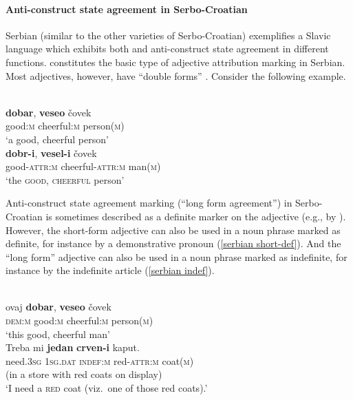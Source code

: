 \paragraph*{Anti\hyp{}construct state agreement in Serbo-Croatian}
\label{serbian synchr}
Serbian (similar to the other varieties of Serbo-Croatian) exemplifies a Slavic language which exhibits both  and anti\hyp{}construct state agreement in different functions.  constitutes the basic type of adjective attribution marking in Serbian. Most adjectives, however, have “double forms” \citep[179–180]{kramsky1972}. Consider the following example.
\begin{exe}
\begin{xlist}
\\
\gll	\textbf{dobar}, \textbf{veseo} čovek\\
	good:\textsc{m} cheerful:\textsc{m} person(\textsc{m})\\
\glt	‘a good, cheerful person’
\\
\gll	\textbf{dobr-i}, \textbf{vesel-i} čovek\\
	good-\textsc{attr:m} cheerful-\textsc{attr:m} man(\textsc{m})\\
\glt	‘the \textsc{good}, \textsc{cheerful} person’
\end{xlist}
\end{exe}
Anti\hyp{}construct state agreement marking (“long form agreement”) in Serbo\hyp{}Croatian is sometimes described as a definite marker on the adjective (e.g., by \citealt[18–19]{kordic1997}). However, the short-form adjective can also be used in a noun phrase marked as definite, for instance by a demonstrative pronoun (\ref{serbian short-def}). And the “long form” adjective can also be used in a noun phrase marked as indefinite, for instance by the indefinite article (\ref{serbian indef}). 
\begin{exe}
\begin{xlist}
\\
\label{serbian short-def} 
\gll	ovaj \textbf{dobar}, \textbf{veseo} \v{c}ovek\\
	\textsc{dem:m} good:\textsc{m} cheerful:\textsc{m} person(\textsc{m})\\
\glt	‘this good, cheerful man’
\\
\label{serbian indef}
\gll	Treba mi \textbf{jedan} \textbf{crven-i} kaput.\\
	need.\textsc{3sg} \textsc{1sg.dat} \textsc{indef:m} red-\textsc{attr:m} coat(\textsc{m})\\
\glt (in a store with red coats on display)\\‘I need a \textsc{red} coat (viz.~one of those red coats).’
\end{xlist}
\end{exe}
